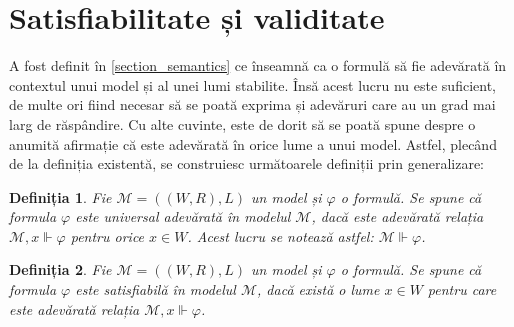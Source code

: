 \documentclass[12pt, openany]{book}
\newtheorem{definition}{Definiția}[chapter] %
\newcommand{\mysectionreference}[1]{\autoref{#1}}
\begin{document}
        \section{Satisfiabilitate și validitate} %
        \label{section_satisfiability_validity}
            \par{}
                A fost definit în \mysectionreference{section_semantics} ce înseamnă ca o 
                formulă să fie adevărată în contextul unui model și al unei lumi stabilite. Însă acest lucru nu este 
                suficient, de multe ori fiind necesar să se poată exprima și adevăruri care au un grad mai larg de răspândire.
                Cu alte cuvinte, este de dorit să se poată spune despre o anumită afirmație că este adevărată în orice lume a unui
                model. Astfel, plecând de la definiția existentă, se construiesc următoarele definiții prin generalizare:

            \begin{definition}
                Fie $\mathcal{M} = ((W,R), L)$ un model și $\varphi$ o formulă. Se spune că formula $\varphi$
                este universal adevărată în modelul $\mathcal{M}$, dacă este adevărată relația $\mathcal{M},x \Vdash \varphi$ pentru
                orice $x \in W$. Acest lucru se notează astfel: $\mathcal{M} \Vdash \varphi$.
            \end{definition}

            \begin{definition}
                Fie $\mathcal{M} = ((W,R), L)$ un model și $\varphi$ o formulă. Se spune că formula $\varphi$
                este satisfiabilă în modelul $\mathcal{M}$, dacă există o lume $x \in W$ pentru care este adevărată relația $\mathcal{M},x \Vdash \varphi$.
            \end{definition}
\end{document}
